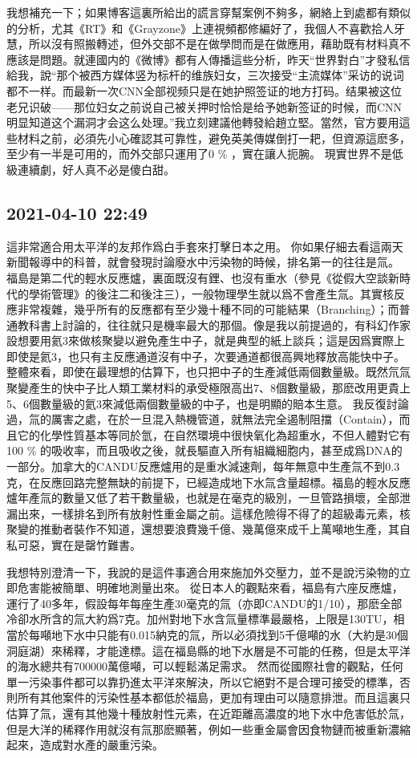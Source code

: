 \documentclass[twocolumn]{ctexart}
\begin{document}
我想補充一下；如果博客這裏所給出的謊言穿幫案例不夠多，網絡上到處都有類似的分析，尤其《RT》和《Grayzone》上連視頻都修編好了，我個人不喜歡拾人牙慧，所以沒有照搬轉述，但外交部不是在做學問而是在做應用，藉助既有材料真不應該是問題。就連國内的《微博》都有人傳播這些分析，昨天“世界對白”才發私信給我，說“那个被西方媒体竖为标杆的维族妇女，三次接受“主流媒体”采访的说词都不一样。而最新一次CNN全部视频只是在她护照签证的地方打码。结果被这位老兄识破——那位妇女之前说自己被关押时恰恰是给予她新签证的时候，而CNN明显知道这个漏洞才会这么处理。”我立刻建議他轉發給趙立堅。當然，官方要用這些材料之前，必須先小心確認其可靠性，避免英美傳媒倒打一耙，但資源這麽多，至少有一半是可用的，而外交部只運用了0 \% ，實在讓人扼腕。
現實世界不是低級連續劇，好人真不必是傻白甜。
\subsection*{2021-04-10 22:49}

這非常適合用太平洋的友邦作爲白手套來打擊日本之用。
你如果仔細去看這兩天新聞報導中的科普，就會發現討論廢水中污染物的時候，排名第一的往往是氚。
福島是第二代的輕水反應爐，裏面既沒有鋰、也沒有重水（參見《從假大空談新時代的學術管理》的後注二和後注三），一般物理學生就以爲不會產生氚。其實核反應非常複雜，幾乎所有的反應都有至少幾十種不同的可能結果（Branching）；而普通教科書上討論的，往往就只是機率最大的那個。像是我以前提過的，有科幻作家設想要用氦3來做核聚變以避免產生中子，就是典型的紙上談兵；這是因爲實際上即使是氦3，也只有主反應通道沒有中子，次要通道都很高興地釋放高能快中子。整體來看，即使在最理想的估算下，也只把中子的生產減低兩個數量級。既然氘氚聚變產生的快中子比人類工業材料的承受極限高出7、8個數量級，那麽改用更貴上5、6個數量級的氦3來減低兩個數量級的中子，也是明顯的賠本生意。
我反復討論過，氚的厲害之處，在於一旦混入熱機管道，就無法完全遏制阻擋（Contain），而且它的化學性質基本等同於氫，在自然環境中很快氧化為超重水，不但人體對它有100 \% 的吸收率，而且吸收之後，就長驅直入所有組織細胞内，甚至成爲DNA的一部分。加拿大的CANDU反應爐用的是重水減速劑，每年無意中生產氚不到0.3克，在反應回路完整無缺的前提下，已經造成地下水氚含量超標。福島的輕水反應爐年產氚的數量又低了若干數量級，也就是在毫克的級別，一旦管路損壞，全部泄漏出來，一樣排名到所有放射性重金屬之前。這樣危險得不得了的超級毒元素，核聚變的推動者裝作不知道，還想要浪費幾千億、幾萬億來成千上萬噸地生產，其自私可惡，實在是罄竹難書。

我想特別澄清一下，我說的是這件事適合用來施加外交壓力，並不是說污染物的立即危害能被簡單、明確地測量出來。
從日本人的觀點來看，福島有六座反應爐，運行了40多年，假設每年每座生產30毫克的氚（亦即CANDU的1/10），那麽全部冷卻水所含的氚大約爲7克。加州對地下水含氚量標準最嚴格，上限是130TU，相當於每噸地下水中只能有0.015納克的氚，所以必須找到5千億噸的水（大約是30個洞庭湖）來稀釋，才能達標。這在福島縣的地下水層是不可能的任務，但是太平洋的海水總共有700000萬億噸，可以輕鬆滿足需求。
然而從國際社會的觀點，任何單一污染事件都可以靠扔進太平洋來解決，所以它絕對不是合理可接受的標準，否則所有其他案件的污染性基本都低於福島，更加有理由可以隨意排泄。而且這裏只估算了氚，還有其他幾十種放射性元素，在近距離高濃度的地下水中危害低於氚，但是大洋的稀釋作用就沒有氚那麽顯著，例如一些重金屬會因食物鏈而被重新濃縮起來，造成對水產的嚴重污染。
\end{document}
